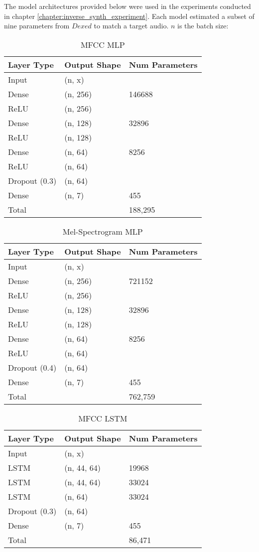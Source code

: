 \label{appendix:spiegelib_models}

The model architectures provided below were used in the experiments conducted in chapter \ref{chapter:inverse_synth_experiment}. Each model estimated a subset of nine parameters from $Dexed$ to match a target audio. $n$ is the batch size:

\begin{table}[ht]
\caption{MFCC MLP}
\centering
\begin{tabular}{l|l|l}
Layer Type & Output Shape & Num Parameters \\ \hline
Input & (n, x) & \\
Dense & (n, 256) & 146688\\
ReLU    & (n, 256) &\\
Dense & (n, 128) & 32896\\
ReLU    & (n, 128) &  \\
Dense & (n, 64) & 8256 \\
ReLU    & (n, 64) & \\
Dropout (0.3) & (n, 64) & \\
Dense   & (n, 7) & 455\\
\hline
\hline
Total   & \ & 188,295\\
\end{tabular}
\end{table}

\begin{table}[ht]
\caption{Mel-Spectrogram MLP}
\centering
\begin{tabular}{l|l|l}
Layer Type & Output Shape & Num Parameters \\ \hline
Input & (n, x) & \\
Dense & (n, 256) & 721152\\
ReLU    & (n, 256) &\\
Dense & (n, 128) & 32896\\
ReLU    & (n, 128) &  \\
Dense & (n, 64) & 8256 \\
ReLU    & (n, 64) & \\
Dropout (0.4) & (n, 64) & \\
Dense   & (n, 7) & 455\\
\hline
\hline
Total   & \ & 762,759\\
\end{tabular}
\end{table}

\begin{table}[ht]
\caption{MFCC LSTM}
\centering
\begin{tabular}{l|l|l}
Layer Type & Output Shape & Num Parameters \\ \hline
Input & (n, x) & \\
LSTM & (n, 44, 64) & 19968\\
LSTM & (n, 44, 64) & 33024\\
LSTM & (n, 64) & 33024\\
Dropout (0.3) & (n, 64) & \\
Dense   & (n, 7) & 455\\
\hline
\hline
Total   & \ & 86,471\\
\end{tabular}
\end{table}


